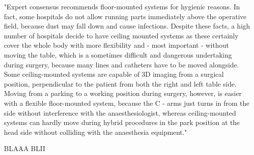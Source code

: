 	"Expert consensus recommends floor-mounted systems for hygienic reasons. In fact, some hospitals do not allow running parts immediately above the operative field, because dust may fall down and cause infections. Despite these facts, a high number of hospitals decide to have ceiling mounted systems as these certainly cover the whole body with more flexibility and - most important - without moving the table, which is a sometimes difficult and dangerous undertaking during surgery, because many lines and catheters have to be moved alongside.  Some ceiling-mounted systems are capable of 3D imaging from a surgical position, perpendicular to the patient from both the right and left table side. Moving from a parking to a working position during surgery, however, is easier with a flexible floor-mounted system, because the C - arms just turns in from the side without interference with the anaesthesiologist, whereas ceiling-mounted systems can hardly move during hybrid procedures in the park position at the head side without colliding with the anaesthesia equipment."
	
	BLAAA BLII